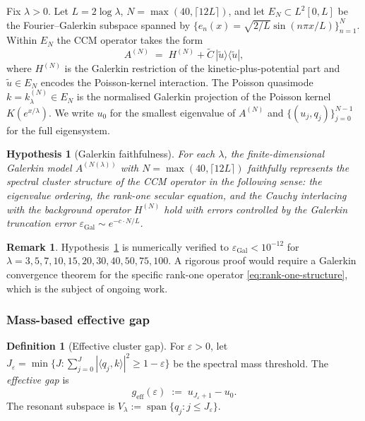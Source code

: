 \documentclass[11pt,a4paper]{article}
\theoremstyle{plain}
\newtheorem{hypothesis}[theorem]{Hypothesis}
\theoremstyle{definition}
\newtheorem{definition}[theorem]{Definition}
\newtheorem{remark}[theorem]{Remark}
\begin{document}
Fix $\lambda > 0$.  Let $L = 2\log\lambda$, $N = \max(40,
\lceil 12L \rceil)$, and let $E_N \subset L^2[0,L]$ be the
Fourier--Galerkin subspace spanned by $\{e_n(x) = \sqrt{2/L}
\sin(n\pi x/L)\}_{n=1}^N$.  Within $E_N$ the CCM operator takes the
form
\begin{equation}\label{eq:rank-one-structure}
  A^{(N)} \;=\; H^{(N)} + \tilde{C}\,|\tilde{u}\rangle\langle\tilde{u}|,
\end{equation}
where $H^{(N)}$ is the Galerkin restriction of the kinetic-plus-potential
part and $\tilde{u} \in E_N$ encodes the Poisson-kernel interaction.
The Poisson quasimode $k = k_\lambda^{(N)} \in E_N$ is the normalised
Galerkin projection of the Poisson kernel $K(e^{x/\lambda})$.
We write $u_0$ for the smallest eigenvalue of $A^{(N)}$ and
$\{(u_j, q_j)\}_{j=0}^{N-1}$ for the full eigensystem.

\begin{hypothesis}[Galerkin faithfulness]
\label{hyp:galerkin}
For each $\lambda$, the finite-dimensional Galerkin model
$A^{(N(\lambda))}$ with $N = \max(40, \lceil 12L \rceil)$
faithfully represents the spectral cluster structure of the CCM
operator in the following sense: the eigenvalue ordering, the rank-one
secular equation, and the Cauchy interlacing with the background
operator $H^{(N)}$ hold with errors controlled by the Galerkin
truncation error $\varepsilon_{\mathrm{Gal}} \sim e^{-c \cdot N/L}$.
\end{hypothesis}

\begin{remark}
Hypothesis~\ref{hyp:galerkin} is numerically verified to
$\varepsilon_{\mathrm{Gal}} < 10^{-12}$ for
$\lambda = 3, 5, 7, 10, 15, 20, 30, 40, 50, 75, 100$.  A rigorous
proof would require a Galerkin convergence theorem for the specific
rank-one operator \eqref{eq:rank-one-structure}, which is the subject
of ongoing work.
\end{remark}

\subsubsection{Mass-based effective gap}

\begin{definition}[Effective cluster gap]\label{def:geff}
For $\varepsilon > 0$, let $J_\varepsilon = \min\{J :
\sum_{j=0}^{J} |\langle q_j, k\rangle|^2 \geq 1 - \varepsilon\}$
be the spectral mass threshold.  The \emph{effective gap} is
\[
  g_{\mathrm{eff}}(\varepsilon) \;:=\; u_{J_\varepsilon + 1} - u_0.
\]
The resonant subspace is $V_\lambda := \operatorname{span}\{q_j :
j \leq J_\varepsilon\}$.
\end{definition}
\end{document}
